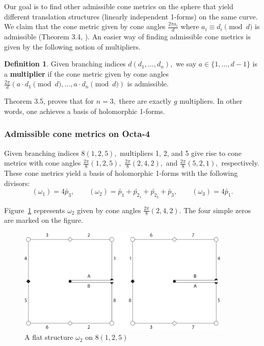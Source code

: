 \documentclass[12pt,reqno]{amsart}
\theoremstyle{definition}
\newtheorem{defn}{Definition}
\theoremstyle{remark}
\begin{document}
Our goal is to find other admissible cone metrics on the sphere that yield different translation structures (linearly independent 1-forms) on the same curve. We claim that the cone metric given by cone angles $\frac{2 \pi a_i}{d}$ where $a_i \equiv d_i \pmod d$ is admissible (Theorem 3.4, \cite{dthesis}). An easier way of finding admissible cone metrics is given by the following notion of multipliers.

\begin{defn} Given branching indices $d (d_1, \ldots , d_n),$ we say $a \in \{1, \ldots, d - 1\}$ is a \textbf{multiplier} if the cone metric given by cone angles $\frac{2 \pi}{d} (a \cdot d_1 \pmod d, \ldots , a \cdot d_n \pmod d)$ is admissible. 
\end{defn}

Theorem 3.5, \cite{dthesis} proves that for $n = 3,$ there are exactly $g$ multipliers. In other words, one achieves a basis of holomorphic 1-forms. 

\subsubsection*{Admissible cone metrics on Octa-4} Given branching indices $8 (1, 2, 5),$ multipliers 1, 2, and 5 give rise to cone metrics with cone angles $\frac{2 \pi}{8}(1, 2, 5),$ $\frac{2 \pi}{8}(2, 4, 2),$ and $\frac{2 \pi}{8}(5, 2, 1),$ respectively. These cone metrics yield a basis of holomorphic 1-forms with the following divisors: $$(\omega_1) = 4 \widetilde{p_3}, \qquad (\omega_2) = \widetilde{p_1} + \widetilde{p_{2_1}} + \widetilde{p_{2_2}} + \widetilde{p_3}, \qquad (\omega_3) = 4 \widetilde{p_1}.$$

Figure~\ref{fig:flat_rs2} represents $\omega_2$ given by cone angles $\frac{2 \pi}{8}(2, 4, 2).$ The four simple zeros are marked on the figure.

\begin{figure}[htbp]
   \centering
   \includegraphics[width=4in]{figures/flat_rs2.pdf} 
	\caption{A flat structure $\omega_2$ on $8(1, 2, 5)$}
	\label{fig:flat_rs2}
\end{figure}
\end{document}
